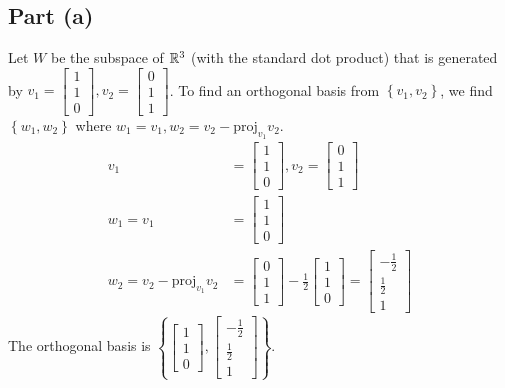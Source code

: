 \documentclass{article}
\begin{document}
\problem
\subsection*{Part (a)}
Let $W$ be the subspace of $\mathbb{R}^3$ (with the standard dot product) that is generated by $v_1 = \begin{bmatrix} 1 \\ 1 \\ 0 \end{bmatrix}, v_2 = \begin{bmatrix} 0 \\ 1 \\ 1 \end{bmatrix}$. To find an orthogonal basis from $\left\{v_1, v_2\right\}$, we find $\left\{w_1, w_2 \right\}$ where $w_1 = v_1, w_2 = v_2 - \mathrm{proj}_{v_1} v_2$.
\begin{equation}
    \begin{split}
        v_1 & = \begin{bmatrix}1 \\ 1 \\ 0\end{bmatrix}, v_2 = \begin{bmatrix}0 \\ 1 \\ 1\end{bmatrix} \\
        w_1 = v_1 & = \begin{bmatrix}1 \\ 1 \\ 0\end{bmatrix} \\
        w_2 = v_2 - \mathrm{proj}_{v_1} v_2 & = \begin{bmatrix}0 \\ 1 \\ 1\end{bmatrix} - \frac{1}{2}\begin{bmatrix}1 \\ 1 \\ 0\end{bmatrix} = \begin{bmatrix}-\frac{1}{2} \\ \frac{1}{2} \\ 1\end{bmatrix}
    \end{split}
\end{equation}
The orthogonal basis is $\left\{\begin{bmatrix}1 \\ 1 \\ 0\end{bmatrix}, \begin{bmatrix}-\frac{1}{2} \\ \frac{1}{2} \\ 1\end{bmatrix}\right\}$.
\end{document}
